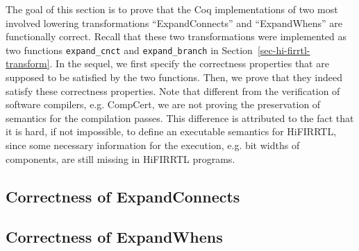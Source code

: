 

The goal of this section is to prove that the Coq implementations of two most involved lowering transformations ``ExpandConnects'' and ``ExpandWhens'' are functionally correct. Recall that these two transformations were implemented as two functions {\tt expand\_cnct} and {\tt expand\_branch} in Section~\ref{sec-hi-firrtl-transform}. In the sequel, we first specify the correctness properties that are supposed to be satisfied by the two functions. Then, we prove that they indeed satisfy these correctness properties. Note that different from the verification of software compilers, e.g. CompCert, we are not proving the preservation of semantics for the compilation passes. This difference is attributed to the fact that it is hard, if not impossible, to define an executable semantics for HiFIRRTL, since some necessary information for the execution, e.g. bit widths of components, are still missing in HiFIRRTL programs. 



\subsection{Correctness of ExpandConnects}



\subsection{Correctness of ExpandWhens}







